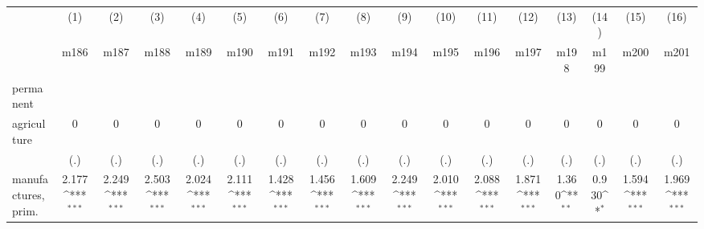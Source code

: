{
\def\sym#1{\ifmmode^{#1}\else\(^{#1}\)\fi}
\begin{tabular}{l*{16}{c}}
\hline\hline
                    &\multicolumn{1}{c}{(1)}&\multicolumn{1}{c}{(2)}&\multicolumn{1}{c}{(3)}&\multicolumn{1}{c}{(4)}&\multicolumn{1}{c}{(5)}&\multicolumn{1}{c}{(6)}&\multicolumn{1}{c}{(7)}&\multicolumn{1}{c}{(8)}&\multicolumn{1}{c}{(9)}&\multicolumn{1}{c}{(10)}&\multicolumn{1}{c}{(11)}&\multicolumn{1}{c}{(12)}&\multicolumn{1}{c}{(13)}&\multicolumn{1}{c}{(14)}&\multicolumn{1}{c}{(15)}&\multicolumn{1}{c}{(16)}\\
                    &\multicolumn{1}{c}{m186}&\multicolumn{1}{c}{m187}&\multicolumn{1}{c}{m188}&\multicolumn{1}{c}{m189}&\multicolumn{1}{c}{m190}&\multicolumn{1}{c}{m191}&\multicolumn{1}{c}{m192}&\multicolumn{1}{c}{m193}&\multicolumn{1}{c}{m194}&\multicolumn{1}{c}{m195}&\multicolumn{1}{c}{m196}&\multicolumn{1}{c}{m197}&\multicolumn{1}{c}{m198}&\multicolumn{1}{c}{m199}&\multicolumn{1}{c}{m200}&\multicolumn{1}{c}{m201}\\
\hline
permanent           &                     &                     &                     &                     &                     &                     &                     &                     &                     &                     &                     &                     &                     &                     &                     &                     \\
agriculture         &           0         &           0         &           0         &           0         &           0         &           0         &           0         &           0         &           0         &           0         &           0         &           0         &           0         &           0         &           0         &           0         \\
                    &         (.)         &         (.)         &         (.)         &         (.)         &         (.)         &         (.)         &         (.)         &         (.)         &         (.)         &         (.)         &         (.)         &         (.)         &         (.)         &         (.)         &         (.)         &         (.)         \\
[1em]
manufactures, prim. &       2.177\sym{***}&       2.249\sym{***}&       2.503\sym{***}&       2.024\sym{***}&       2.111\sym{***}&       1.428\sym{***}&       1.456\sym{***}&       1.609\sym{***}&       2.249\sym{***}&       2.010\sym{***}&       2.088\sym{***}&       1.871\sym{***}&       1.360\sym{**} &       0.930\sym{*}  &       1.594\sym{***}&       1.969\sym{***}\\

\end{tabular}}
